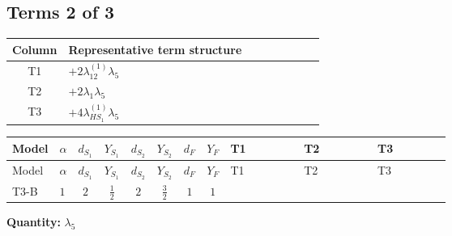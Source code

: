 \documentclass[8pt]{article}
\begin{document}
\begin{landscape}
\subsection*{Terms 2 of 3}
\begin{center}
\begin{tabular}{@{}c >{\raggedright\arraybackslash}p{0.82\linewidth}@{}}
\toprule
Column & Representative term structure \\
\midrule
T1 & \(\displaystyle +2 {\lambda_{12}^{(1)}} {\lambda_5}\) \\
\midrule
T2 & \(\displaystyle +2 {\lambda_1} {\lambda_5}\) \\
\midrule
T3 & \(\displaystyle +4 {\lambda_{HS_1}^{(1)}} {\lambda_5}\) \\
\midrule
\bottomrule
\end{tabular}
\end{center}
\smallskip
\tiny
\begin{longtable}{@{}llcccccc >{\raggedright\arraybackslash}p{0.21\linewidth} >{\raggedright\arraybackslash}p{0.21\linewidth} >{\raggedright\arraybackslash}p{0.21\linewidth}@{}}
\toprule
Model & $\alpha$ & $d_{S_1}$ & $Y_{S_1}$ & $d_{S_2}$ & $Y_{S_2}$ & $d_F$ & $Y_F$ & T1 & T2 & T3 \\
\midrule
\endfirsthead
\toprule
Model & $\alpha$ & $d_{S_1}$ & $Y_{S_1}$ & $d_{S_2}$ & $Y_{S_2}$ & $d_F$ & $Y_F$ & T1 & T2 & T3 \\
\midrule
\endhead
T3-B & $1$ & $2$ & $\frac{1}{2}$ & $2$ & $\frac{3}{2}$ & $1$ & $1$ & \scriptsize\adjustbox{max width=\linewidth}{$\begin{gathered} +2 {\lambda_{12}^{(1)}} {\lambda_5}\end{gathered}$} & \scriptsize\adjustbox{max width=\linewidth}{$\begin{gathered} +2 {\lambda_1} {\lambda_5}\end{gathered}$} & \scriptsize\adjustbox{max width=\linewidth}{$\begin{gathered} +4 {\lambda_{HS_1}^{(1)}} {\lambda_5}\end{gathered}$} \\
\midrule
\bottomrule
\end{longtable}
\clearpage
\noindent\textbf{Quantity: }$\lambda_5$\par\smallskip

\end{landscape}
\end{document}

